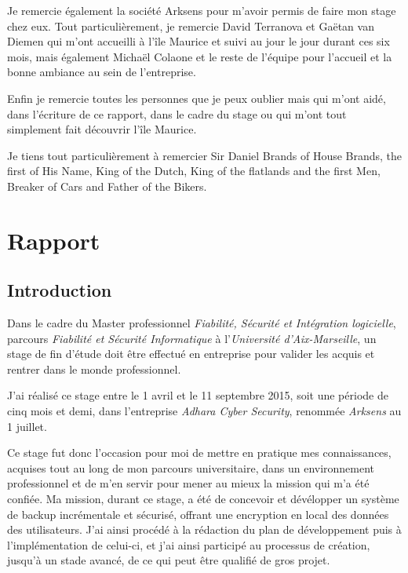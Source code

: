 \documentclass[a4paper,10pt, twoside]{report}
\begin{document}
\begin{spacing}{1.2}
Je remercie également la société Arksens pour m'avoir permis de faire mon
stage chez eux. Tout particulièrement, je remercie David Terranova et Gaëtan
van Diemen qui m'ont accueilli à l'île Maurice et suivi au jour le jour
durant ces six mois, mais également Michaël Colaone et le reste de
l'équipe pour l'accueil et la bonne ambiance au sein de l'entreprise.

Enfin je remercie toutes les personnes que je peux oublier mais qui m'ont
aidé, dans l'écriture de ce rapport, dans le cadre du stage ou qui m'ont
tout simplement fait découvrir l'île Maurice.

Je tiens tout particulièrement à remercier Sir Daniel Brands of House Brands,
the first of His Name, King of the Dutch, King of the flatlands and the first
Men, Breaker of Cars and Father of the Bikers.

\clearpage
\pagestyle{fancy}
\tableofcontents
\clearpage

\part{Rapport}
\thispagestyle{empty}
\chapter{Introduction}
\thispagestyle{fancy}
Dans le cadre du Master professionnel \textit{Fiabilité, Sécurité et
Intégration logicielle}, parcours \textit{Fiabilité et Sécurité
Informatique} à l'\textit{Université d'Aix-Marseille}, un stage de fin
d'étude doit être effectué en entreprise pour valider les acquis et
rentrer dans le monde professionnel.

J'ai réalisé ce stage entre le 1 avril et le 11 septembre 2015, soit
une période de cinq mois et demi, dans l'entreprise \textit{Adhara Cyber
Security}, renommée \textit{Arksens} au 1 juillet.

Ce stage fut donc l'occasion pour moi de mettre en pratique mes connaissances,
acquises tout au long de mon parcours universitaire, dans un environnement
professionnel et de m'en servir pour mener au mieux la mission qui m'a
été confiée. Ma mission, durant ce stage, a été de concevoir et
dévélopper un système de backup incrémentale et sécurisé, offrant
une encryption en local des données des utilisateurs. J'ai ainsi procédé
à la rédaction du plan de développement puis à l'implémentation de
celui-ci, et j'ai ainsi participé au processus de création, jusqu'à un
stade avancé, de ce qui peut être qualifié de gros projet.


\end{spacing}
\end{document}
